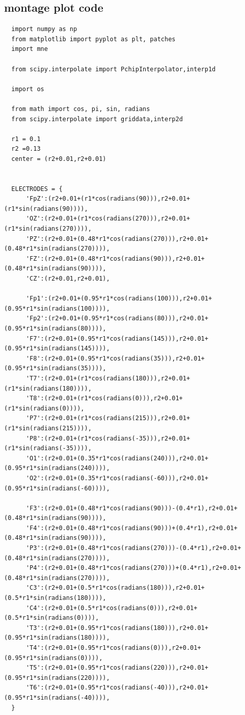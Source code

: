 \documentclass[10pt]{article}
\begin{document}
\subsection{montage plot code}\label{montage_plot_code}
\begin{lstlisting}
  import numpy as np
  from matplotlib import pyplot as plt, patches
  import mne
  
  from scipy.interpolate import PchipInterpolator,interp1d
  
  import os
  
  from math import cos, pi, sin, radians
  from scipy.interpolate import griddata,interp2d
  
  r1 = 0.1
  r2 =0.13
  center = (r2+0.01,r2+0.01)
  
  
  ELECTRODES = {
      'FpZ':(r2+0.01+(r1*cos(radians(90))),r2+0.01+(r1*sin(radians(90)))),
      'OZ':(r2+0.01+(r1*cos(radians(270))),r2+0.01+(r1*sin(radians(270)))),
      'PZ':(r2+0.01+(0.48*r1*cos(radians(270))),r2+0.01+(0.48*r1*sin(radians(270)))),
      'FZ':(r2+0.01+(0.48*r1*cos(radians(90))),r2+0.01+(0.48*r1*sin(radians(90)))),
      'CZ':(r2+0.01,r2+0.01),
  
      'Fp1':(r2+0.01+(0.95*r1*cos(radians(100))),r2+0.01+(0.95*r1*sin(radians(100)))),
      'Fp2':(r2+0.01+(0.95*r1*cos(radians(80))),r2+0.01+(0.95*r1*sin(radians(80)))),
      'F7':(r2+0.01+(0.95*r1*cos(radians(145))),r2+0.01+(0.95*r1*sin(radians(145)))),
      'F8':(r2+0.01+(0.95*r1*cos(radians(35))),r2+0.01+(0.95*r1*sin(radians(35)))),
      'T7':(r2+0.01+(r1*cos(radians(180))),r2+0.01+(r1*sin(radians(180)))),
      'T8':(r2+0.01+(r1*cos(radians(0))),r2+0.01+(r1*sin(radians(0)))),
      'P7':(r2+0.01+(r1*cos(radians(215))),r2+0.01+(r1*sin(radians(215)))),
      'P8':(r2+0.01+(r1*cos(radians(-35))),r2+0.01+(r1*sin(radians(-35)))),
      'O1':(r2+0.01+(0.35*r1*cos(radians(240))),r2+0.01+(0.95*r1*sin(radians(240)))),
      'O2':(r2+0.01+(0.35*r1*cos(radians(-60))),r2+0.01+(0.95*r1*sin(radians(-60)))),
  
      'F3':(r2+0.01+(0.48*r1*cos(radians(90)))-(0.4*r1),r2+0.01+(0.48*r1*sin(radians(90)))),
      'F4':(r2+0.01+(0.48*r1*cos(radians(90)))+(0.4*r1),r2+0.01+(0.48*r1*sin(radians(90)))),
      'P3':(r2+0.01+(0.48*r1*cos(radians(270)))-(0.4*r1),r2+0.01+(0.48*r1*sin(radians(270)))),
      'P4':(r2+0.01+(0.48*r1*cos(radians(270)))+(0.4*r1),r2+0.01+(0.48*r1*sin(radians(270)))),
      'C3':(r2+0.01+(0.5*r1*cos(radians(180))),r2+0.01+(0.5*r1*sin(radians(180)))),
      'C4':(r2+0.01+(0.5*r1*cos(radians(0))),r2+0.01+(0.5*r1*sin(radians(0)))),
      'T3':(r2+0.01+(0.95*r1*cos(radians(180))),r2+0.01+(0.95*r1*sin(radians(180)))),
      'T4':(r2+0.01+(0.95*r1*cos(radians(0))),r2+0.01+(0.95*r1*sin(radians(0)))),
      'T5':(r2+0.01+(0.95*r1*cos(radians(220))),r2+0.01+(0.95*r1*sin(radians(220)))),
      'T6':(r2+0.01+(0.95*r1*cos(radians(-40))),r2+0.01+(0.95*r1*sin(radians(-40)))),
  }
  

\end{lstlisting}
\end{document}
